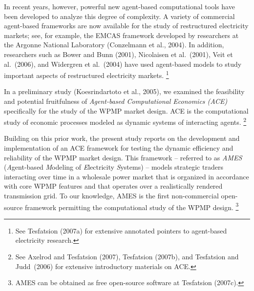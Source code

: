 \documentclass[12pt]{article}
\begin{document}
In recent years, however, powerful new agent-based computational tools have been developed 
to analyze this degree of complexity.   A variety of commercial agent-based frameworks are 
now available for the study of restructured electricity markets; see, for example, 
the EMCAS framework developed by researchers at the Argonne National Laboratory (Conzelmann et al., 2004).  
In addition, researchers such as Bower and Bunn (2001), Nicolaisen et al.~(2001), Veit et al.~(2006), and 
Widergren et al.~(2004) have used agent-based models to study important aspects of restructured electricity markets.%
    \footnote{See Tesfatsion (2007a) for extensive annotated pointers to agent-based electricity research.}

In a preliminary study (Koesrindartoto et al., 2005), we examined the feasibility and 
potential fruitfulness of \textit{Agent-based Computational Economics (ACE)\/} specifically for the study of the WPMP market design.  ACE is the computational study of economic processes modeled as dynamic systems of interacting agents.%
     \footnote{See Axelrod and Tesfatsion (2007), Tesfatsion (2007b), and Tesfatsion and Judd~(2006) for extensive introductory materials on ACE.}
       
Building on this prior work, the present study reports on the development and implementation of
an ACE framework for testing the dynamic efficiency and
reliability of the WPMP market design.  This framework 
-- referred to as {\it AMES\/} ({\it A\/}gent-based {\it
M\/}odeling of {\it E\/}lectricity {\it S\/}ystems) -- 
models strategic traders interacting over time in a wholesale power
market that is organized in accordance with core WPMP features
and that operates over a realistically rendered transmission
grid.  To our knowledge, AMES is the 
first non-commercial open-source framework permitting the 
computational study of the WPMP design.%
  \footnote{AMES can be obtained as free open-source software at Tesfatsion (2007c).}
\end{document}
